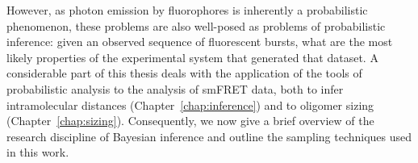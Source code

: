 However, as photon emission by fluorophores is inherently a probabilistic phenomenon, these problems are also well-posed as problems of probabilistic inference: given an observed sequence of fluorescent bursts, what are the most likely properties of the experimental system that generated that dataset. A considerable part of this thesis deals with the application of the tools of probabilistic analysis to the analysis of smFRET data, both to infer intramolecular distances (Chapter~\ref{chap:inference}) and to oligomer sizing (Chapter~\ref{chap:sizing}). Consequently, we now give a brief overview of the research discipline of Bayesian inference and outline the sampling techniques used in this work.  





